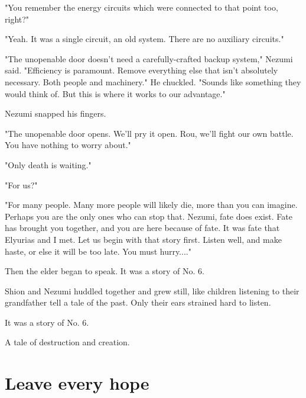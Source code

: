 "You remember the energy circuits which were connected to that point
too, right?"

"Yeah. It was a single circuit, an old system. There are no auxiliary
circuits."

"The unopenable door doesn't need a carefully-crafted backup system,"
Nezumi said. "Efficiency is paramount. Remove everything else that isn't
absolutely necessary. Both people and machinery." He chuckled. "Sounds
like something they would think of. But this is where it works to our
advantage."

Nezumi snapped his fingers.

"The unopenable door opens. We'll pry it open. Rou, we'll fight our own
battle. You have nothing to worry about."

"Only death is waiting."

"For us?"

"For many people. Many more people will likely die, more than you can
imagine. Perhaps you are the only ones who can stop that. Nezumi, fate
does exist. Fate has brought you together, and you are here because of
fate. It was fate that Elyurias and I met. Let us begin with that story
first. Listen well, and make haste, or else it will be too late. You
must hurry...."

Then the elder began to speak. It was a story of No. 6.

Shion and Nezumi huddled together and grew still, like children
listening to their grandfather tell a tale of the past. Only their ears
strained hard to listen.

It was a story of No. 6.

A tale of destruction and creation.

\chapter{Leave every hope}


